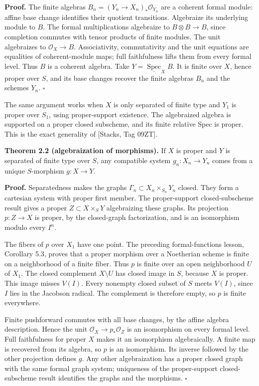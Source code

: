 \documentclass[11pt]{article}
\begin{document}
\textbf{Proof.} The finite algebras
\(B_n=(Y_n\to X_n)_*\mathcal O_{Y_n}\) are a coherent formal module:
affine base change identifies their quotient transitions. Algebraize its
underlying module to \(B\). The formal multiplications algebraize to
\(B\otimes B\to B\), since completion commutes with tensor products of
finite modules. The unit algebraizes to \(\mathcal O_X\to B\).
Associativity, commutativity and the unit equations are equalities of
coherent-module maps; full faithfulness lifts them from every formal
level. Thus \(B\) is a coherent algebra. Take
\(Y=\underline{\operatorname{Spec}}_X B\). It is finite over \(X\),
hence proper over \(S\), and its base changes recover the finite
algebras \(B_n\) and the schemes \(Y_n\). \(\square\)

The same argument works when \(X\) is only separated of finite type and
\(Y_1\) is proper over \(S_1\), using proper-support existence. The
algebraized algebra is supported on a proper closed subscheme, and its
finite relative Spec is proper. This is the exact generality of
{[}Stacks, Tag 09ZT{]}.

\textbf{Theorem 2.2 (algebraization of morphisms).} If \(X\) is proper
and \(Y\) is separated of finite type over \(S\), any compatible system
\(g_n:X_n\to Y_n\) comes from a unique \(S\)-morphism \(g:X\to Y\).

\textbf{Proof.} Separatedness makes the graphs
\(\Gamma_n\subset X_n\times_{S_n}Y_n\) closed. They form a cartesian
system with proper first member. The proper-support closed-subscheme
result gives a proper \(Z\subset X\times_S Y\) algebraizing these
graphs. Its projection \(p:Z\to X\) is proper, by the closed-graph
factorization, and is an isomorphism modulo every \(I^n\).

The fibers of \(p\) over \(X_1\) have one point. The preceding
formal-functions lesson, Corollary 5.3, proves that a proper morphism
over a Noetherian scheme is finite on a neighborhood of a finite fiber.
Thus \(p\) is finite over an open neighborhood \(U\) of \(X_1\). The
closed complement \(X\setminus U\) has closed image in \(S\), because
\(X\) is proper. This image misses \(V(I)\). Every nonempty closed
subset of \(S\) meets \(V(I)\), since \(I\) lies in the Jacobson
radical. The complement is therefore empty, so \(p\) is finite
everywhere.

Finite pushforward commutes with all base changes, by the affine algebra
description. Hence the unit \(\mathcal O_X\to p_*\mathcal O_Z\) is an
isomorphism on every formal level. Full faithfulness for proper \(X\)
makes it an isomorphism algebraically. A finite map is recovered from
its algebra, so \(p\) is an isomorphism. Its inverse followed by the
other projection defines \(g\). Any other algebraization has a proper
closed graph with the same formal graph system; uniqueness of the
proper-support closed-subscheme result identifies the graphs and the
morphisms. \(\square\)
\end{document}
